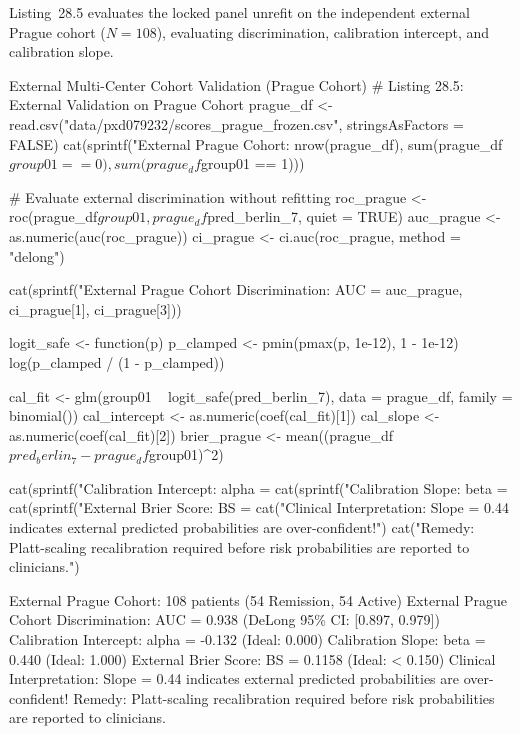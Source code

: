 \documentclass[11pt,twoside,openright]{book}
\begin{document}
Listing~28.5 evaluates the locked panel unrefit on the independent external Prague cohort ($N = 108$), evaluating discrimination, calibration intercept, and calibration slope.

\begin{rchunk}{External Multi-Center Cohort Validation (Prague Cohort)}
# Listing 28.5: External Validation on Prague Cohort
prague_df <- read.csv("data/pxd079232/scores_prague_frozen.csv", stringsAsFactors = FALSE)
cat(sprintf("External Prague Cohort: %
            nrow(prague_df), sum(prague_df$group01 == 0), sum(prague_df$group01 == 1)))

# Evaluate external discrimination without refitting
roc_prague <- roc(prague_df$group01, prague_df$pred_berlin_7, quiet = TRUE)
auc_prague <- as.numeric(auc(roc_prague))
ci_prague  <- ci.auc(roc_prague, method = "delong")

cat(sprintf("External Prague Cohort Discrimination: AUC = %
            auc_prague, ci_prague[1], ci_prague[3]))

logit_safe <- function(p) {
  p_clamped <- pmin(pmax(p, 1e-12), 1 - 1e-12)
  log(p_clamped / (1 - p_clamped))
}

cal_fit <- glm(group01 ~ logit_safe(pred_berlin_7), data = prague_df, family = binomial())
cal_intercept <- as.numeric(coef(cal_fit)[1])
cal_slope     <- as.numeric(coef(cal_fit)[2])
brier_prague  <- mean((prague_df$pred_berlin_7 - prague_df$group01)^2)

cat(sprintf("Calibration Intercept: alpha = %
cat(sprintf("Calibration Slope:     beta  = %
cat(sprintf("External Brier Score:  BS    = %
cat("Clinical Interpretation: Slope = 0.44 indicates external predicted probabilities are over-confident!\n")
cat("Remedy: Platt-scaling recalibration required before risk probabilities are reported to clinicians.\n")
\end{rchunk}

\begin{routput}
External Prague Cohort: 108 patients (54 Remission, 54 Active)
External Prague Cohort Discrimination: AUC = 0.938 (DeLong 95\% CI: [0.897, 0.979])
Calibration Intercept: alpha = -0.132 (Ideal: 0.000)
Calibration Slope:     beta  = 0.440 (Ideal: 1.000)
External Brier Score:  BS    = 0.1158 (Ideal: < 0.150)
Clinical Interpretation: Slope = 0.44 indicates external predicted probabilities are over-confident!
Remedy: Platt-scaling recalibration required before risk probabilities are reported to clinicians.
\end{routput}
\end{document}
